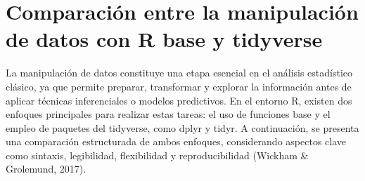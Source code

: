 \documentclass[
  spanish,
  a4paper,
  DIV=11,
  numbers=noendperiod,
  onepage,
  openany]{scrreprt}
\begin{document}
\section{Comparación entre la manipulación de datos con R base y
tidyverse}\label{comparaciuxf3n-entre-la-manipulaciuxf3n-de-datos-con-r-base-y-tidyverse}

La manipulación de datos constituye una etapa esencial en el análisis
estadístico clásico, ya que permite preparar, transformar y explorar la
información antes de aplicar técnicas inferenciales o modelos
predictivos. En el entorno R, existen dos enfoques principales para
realizar estas tareas: el uso de funciones base y el empleo de paquetes
del tidyverse, como dplyr y tidyr. A continuación, se presenta una
comparación estructurada de ambos enfoques, considerando aspectos clave
como sintaxis, legibilidad, flexibilidad y reproducibilidad (Wickham \&
Grolemund, 2017).
\end{document}
